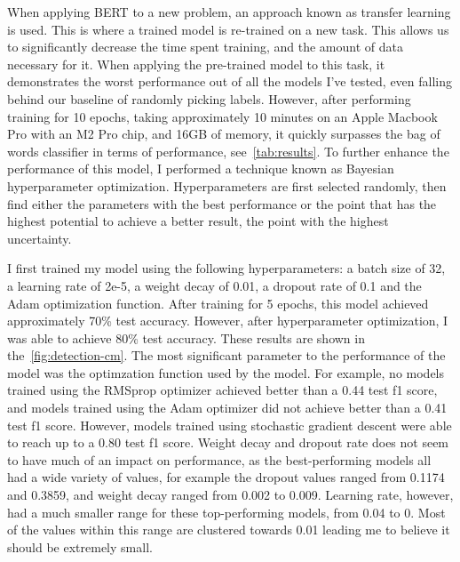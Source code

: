 \documentclass[twocolumn]{article}
\begin{document}
When applying BERT to a new problem, an approach known as transfer learning is used. This is where a trained model is re-trained on a new task. This allows us to significantly decrease the time spent training, and the amount of data necessary for it. When applying the pre-trained model to this task, it demonstrates the worst performance out of all the models I've tested, even falling behind our baseline of randomly picking labels. However, after performing training for 10 epochs, taking approximately 10 minutes on an Apple Macbook Pro with an M2 Pro chip, and 16GB of memory, it quickly surpasses the bag of words classifier in terms of performance, see~\autoref{tab:results}. To further enhance the performance of this model, I performed a technique known as Bayesian hyperparameter optimization. Hyperparameters are first selected randomly, then find either the parameters with the best performance or the point that has the highest potential to achieve a better result, the point with the highest uncertainty. 

I first trained my model using the following hyperparameters: a batch size of 32, a learning rate of 2e-5, a weight decay of 0.01, a dropout rate of 0.1 and the Adam optimization function. After training for 5 epochs, this model achieved approximately 70\% test accuracy. However, after hyperparameter optimization, I was able to achieve 80\% test accuracy. These results are shown in the~\autoref{fig:detection-cm}. The most significant parameter to the performance of the model was the optimzation function used by the model. For example, no models trained using the RMSprop optimizer achieved better than a 0.44 test f1 score, and models trained using the Adam optimizer did not achieve better than a 0.41 test f1 score. However, models trained using stochastic gradient descent were able to reach up to a 0.80 test f1 score. Weight decay and dropout rate does not seem to have much of an impact on performance, as the best-performing models all had a wide variety of values, for example the dropout values ranged from 0.1174 and 0.3859, and weight decay ranged from 0.002 to 0.009. Learning rate, however, had a much smaller range for these top-performing models, from 0.04 to 0. Most of the values within this range are clustered towards 0.01 leading me to believe it should be extremely small.
\end{document}

